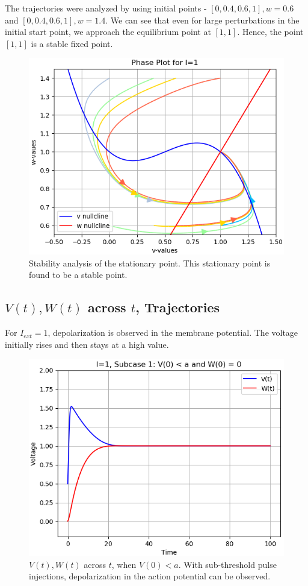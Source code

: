 \documentclass[12pt,a4paper]{article}
\begin{document}
	The trajectories were analyzed by using initial points - $[0, 0.4, 0.6, 1], w=0.6$ and $[0, 0.4, 0.6, 1], w=1.4$. We can see that even for large perturbations in the initial start point, we approach the equilibrium point at $[1,1]$. Hence, the point $[1,1]$ is a stable fixed point.

	\begin{figure}[H]
	\centering
	\includegraphics[scale=0.6]{images/Figure_10.png}
	\caption{Stability analysis of the stationary point. This stationary point is found to be a stable point.}
	\end{figure}

\subsection{$V(t), W(t)$ across $t$, Trajectories}
	For $I_{ext}=1$, depolarization is observed in the membrane potential. The voltage initially rises and then stays at a high value.
	\begin{figure}[H]
	\centering
	\includegraphics[scale=0.6]{images/Figure_11.png}
	\caption{$V(t), W(t)$ across $t$, when $V(0)<a$. With sub-threshold pulse injections, depolarization in the action potential can be observed.}
	\end{figure}
\end{document}
